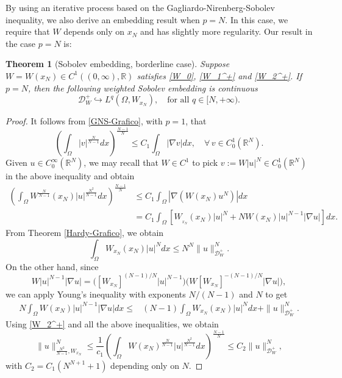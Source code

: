 \documentclass[12pt]{amsart}
\newtheorem{theorem}{Theorem}[section]
\theoremstyle{definition}
\theoremstyle{plain}
\newcommand{\dint}{\int_{\Omega}}
\begin{document}
    By using an iterative process based on the Gagliardo-Nirenberg-Sobolev inequality, 
    we also derive an embedding result when $p=N$. In this case,  we require that $W$ 
    depends only on $x_N$ and has slightly more regularity. Our result in the case $p=N$ is:
	
	\begin{theorem}[Sobolev embedding, borderline case]\label{Sobolev p=N} Suppose 
     $W=W(x_N)\in C^1((0,\infty),\mathbb{R})$ satisfies \eqref{W_0}, \eqref{W_1^+} 
     and \eqref{W_2^+}. If $p=N$, then the following weighted Sobolev embedding is continuous
    $$
    \mathcal{D}_W^+ \hookrightarrow L^q(\Omega,W_{x_N}),  \quad \text{for all } 
    q \in [N,+\infty).
    $$
    \end{theorem}

    	\begin{proof}
		It follows from  \eqref{GNS-Grafico},  with $p=1$, that 
		\begin{equation}\label{GNS n=1}
			\left(\dint |v|^{\frac{N}{N-1}}dx\right)^{\frac{N-1}{N}} \leq C_1\dint |\nabla v|dx,
            \quad \forall \,v \in C_0^1(\mathbb{R}^N).
		\end{equation}
		 Given $u \in C^{\infty}_0(\mathbb{R}^N)$, we may recall that $W \in C^1$ to  
         pick   $v:=W|u|^N \in C_0^1(\mathbb{R}^N)$  in the above inequality  and obtain
      $$
		\begin{aligned}
			\left(\dint W^{\frac{N}{N-1}}(x_N)|u|^{\frac{N^2}{N-1}}dx\right)^{\frac{N-1}{N}}& 
            \leq C_1\dint |\nabla (W(x_N)u^N)|dx\\
			&= C_1  \dint \left[ W_{_{x_N}}(x_N)|u|^N+NW(x_N)|u|^{N-1}|\nabla u|\right]dx.
		\end{aligned}
		$$
        From Theorem \ref{Hardy-Grafico}, we obtain 
		$$
		\dint W_{x_N}(x_N)|u|^Ndx\leq N^ N\|u\|_{\mathcal{D}_W^+}^N.
		$$
		On the other hand, since
        $$
        W|u|^{N-1}|\nabla u|= \Big( [W_{x_N}]^{(N-1)/N}|u|^{N-1} \Big) 
        \Big( W [W_{x_N}]^{{-(N-1)/N}} |\nabla u|\Big),
        $$
        we can apply Young's inequality with 
        exponents $N/(N-1)$ and $N$ to get
      \begin{align*}
			N\dint W(x_N)|u|^{N-1}|\nabla u|dx	\leq&(N-1)
            \dint W_{x_N}(x_N)|u|^Ndx+\|u\|^N_{\mathcal{D}_W^+}.
		\end{align*}
        Using \eqref{W_2^+} and all the above inequalities, we obtain
        \begin{equation}\label{key2}	
        \|u\|_{\frac{N^2}{N-1},W_{x_N}}^N   \leq \frac{1}{c_1}\left(\dint  
        W(x_N)^{\frac{N}{N-1}}|u|^{\frac{N^2}{N-1}}dx\right)^{\frac{N-1}{N}} \leq 
        C_2\|u\|_{\mathcal{D}_W^+}^N,
        \end{equation}
        with $C_2=C_1 (N^{N+1}+1)$ depending only on $N$. 
        

\end{proof}
\end{document}
